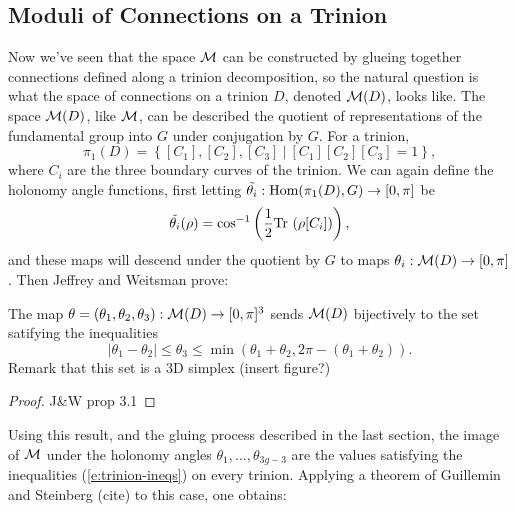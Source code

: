 \subsection{Moduli of Connections on a Trinion}
 	Now we've seen that the space $\mathcal{M}$ can be constructed by glueing together connections defined along a trinion decomposition, so the natural question is what the space of connections on a trinion $D$, denoted $\mathcal{M}(D)$, looks like. The space $\mathcal{M}(D)$, like $\mathcal{M}$, can be described the quotient of representations of the fundamental group into $G$ under conjugation by $G$. For a trinion, 
	\begin{equation}
		\pi_1(D) = \left\{
		[C_1], [C_2], [C_3] ~|~ [C_1][C_2][C_3]  =1
		\right\},
	\end{equation}
	where $C_i$ are the three boundary curves of the trinion. We can again define the holonomy angle functions, first letting $\tilde{\theta_i}:\text{Hom}(\pi_1(D),G) \to [0,\pi]$ be
	\begin{equation}
		\tilde{\theta_i}(\rho) = \cos^{-1}\left(\frac{1}{2}\text{Tr }(\rho[C_i])\right),
	\end{equation}
	and these maps will descend under the quotient by $G$ to maps $\theta_i:\mathcal{M}(D)\to [0,\pi]$. Then Jeffrey and Weitsman prove:
	\begin{theorem}
		The map $\theta = (\theta_1, \theta_2, \theta_3):\mathcal{M}(D)\to[0,\pi]^3$ sends $\mathcal{M}(D)$ bijectively to the set satifying the inequalities
		\begin{equation}
			|\theta_1 - \theta_2| \leq \theta_3 \leq \min(\theta_1 + \theta_2, 2\pi - (\theta_1 + \theta_2)).
			\label{e:trinion-ineqs}
		\end{equation}
		Remark that this set is a 3D simplex (insert figure?)
	\end{theorem}
	\begin{proof}
		J\&W prop 3.1
	\end{proof}
	Using this result, and the gluing process described in the last section, the image of $\mathcal{M}$ under the holonomy angles $\theta_1,...,\theta_{3g-3}$ are the values satisfying the inequalities (\ref{e:trinion-ineqs}) on every trinion. Applying a theorem of Guillemin and Steinberg (cite) to this case, one obtains:
